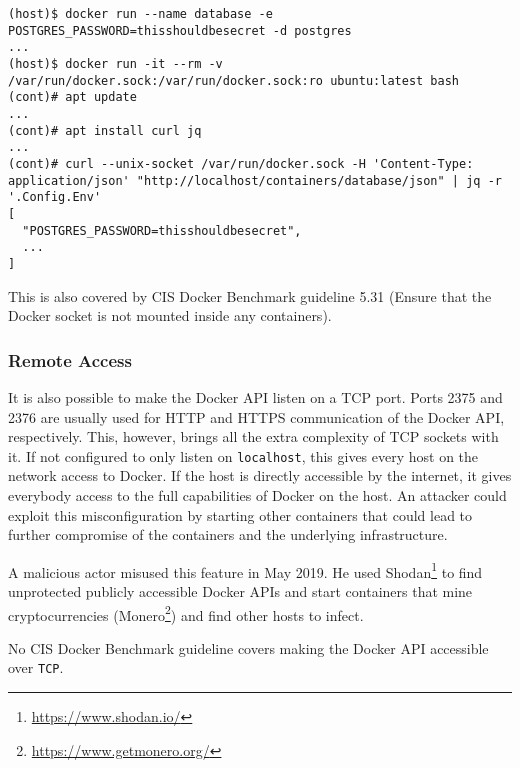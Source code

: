 \begin{lstlisting}[caption={Example extract secrets using the Docker API.},captionpos=b]
(host)$ docker run --name database -e POSTGRES_PASSWORD=thisshouldbesecret -d postgres
...
(host)$ docker run -it --rm -v /var/run/docker.sock:/var/run/docker.sock:ro ubuntu:latest bash
(cont)# apt update
...
(cont)# apt install curl jq
...
(cont)# curl --unix-socket /var/run/docker.sock -H 'Content-Type: application/json' "http://localhost/containers/database/json" | jq -r '.Config.Env'
[
  "POSTGRES_PASSWORD=thisshouldbesecret",
  ...
]
\end{lstlisting}

\medskip

This is also covered by CIS Docker Benchmark guideline 5.31 (Ensure that the Docker socket is not mounted inside any containers).

\subsubsection{Remote Access}\label{subsubsection:remote-access}
It is also possible to make the Docker API listen on a TCP port. Ports 2375 and 2376 are usually used for HTTP and HTTPS communication of the Docker API, respectively. This, however, brings all the extra complexity of TCP sockets with it. If not configured to only listen on \lstinline{localhost}, this gives every host on the network access to Docker. If the host is directly accessible by the internet, it gives everybody access to the full capabilities of Docker on the host. An attacker could exploit this misconfiguration by starting other containers that could lead to further compromise of the containers and the underlying infrastructure\cite{Metasploit-Unprotected-TCP-Socket}.

\medskip

A malicious actor misused this feature in May 2019. He used Shodan\footnote{\url{https://www.shodan.io/}} to find unprotected publicly accessible Docker APIs and start containers that mine cryptocurrencies (Monero\footnote{\url{https://www.getmonero.org/}}) and find other hosts to infect\cite{zoolu2-bot-1807}\cite{zoolu2-bot-1809}\cite{zoolu2-bot-1853}.

\medskip

No CIS Docker Benchmark guideline covers making the Docker API accessible over \lstinline{TCP}.
